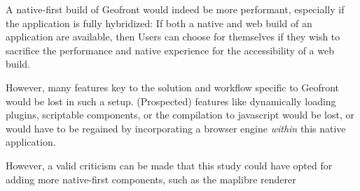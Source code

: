 A native-first build of Geofront would indeed be more performant, especially if the application is fully hybridized:
If both a native and web build of an application are available, then Users can choose for themselves if they wish to sacrifice the performance and native experience for the accessibility of a web build. 
 
However, many features key to the solution and workflow specific to Geofront would be lost in such a setup.  
(Prospected) features like dynamically loading plugins, scriptable components, or the compilation to javascript would be lost, or would have to be regained by incorporating a browser engine \emph{within} this native application. 

However, a valid criticism can be made that this study could have opted for adding more native-first components, such as the maplibre renderer \citep{ammann_maplibre-rs_2022}










